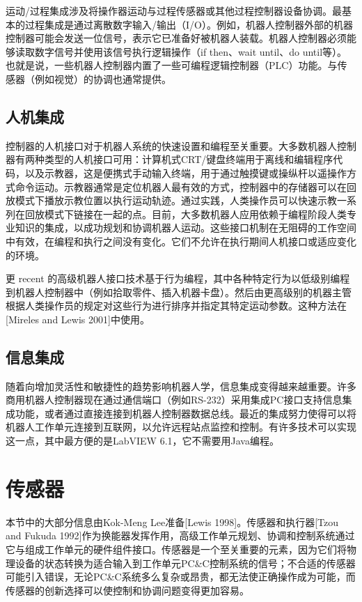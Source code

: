 \documentclass[UTF8,a4paper]{ctexart}
\begin{document}
运动/过程集成涉及将操作器运动与过程传感器或其他过程控制器设备协调。最基本的过程集成是通过离散数字输入/输出（I/O）。例如，机器人控制器外部的机器控制器可能会发送一位信号，表示它已准备好被机器人装载。机器人控制器必须能够读取数字信号并使用该信号执行逻辑操作（if then、wait until、do until等）。也就是说，一些机器人控制器内置了一些可编程逻辑控制器（PLC）功能。与传感器（例如视觉）的协调也通常提供。

\subsection{人机集成}

控制器的人机接口对于机器人系统的快速设置和编程至关重要。大多数机器人控制器有两种类型的人机接口可用：计算机式CRT/键盘终端用于离线和编辑程序代码，以及示教器，这是便携式手动输入终端，用于通过触摸键或操纵杆以遥操作方式命令运动。示教器通常是定位机器人最有效的方式，控制器中的存储器可以在回放模式下播放示教位置以执行运动轨迹。通过实践，人类操作员可以快速示教一系列在回放模式下链接在一起的点。目前，大多数机器人应用依赖于编程阶段人类专业知识的集成，以成功规划和协调机器人运动。这些接口机制在无阻碍的工作空间中有效，在编程和执行之间没有变化。它们不允许在执行期间人机接口或适应变化的环境。

更 recent 的高级机器人接口技术基于行为编程，其中各种特定行为以低级别编程到机器人控制器中（例如拾取零件、插入机器卡盘）。然后由更高级别的机器主管根据人类操作员的规定对这些行为进行排序并指定其特定运动参数。这种方法在[Mireles and Lewis 2001]中使用。

\subsection{信息集成}

随着向增加灵活性和敏捷性的趋势影响机器人学，信息集成变得越来越重要。许多商用机器人控制器现在通过通信端口（例如RS-232）采用集成PC接口支持信息集成功能，或者通过直接连接到机器人控制器数据总线。最近的集成努力使得可以将机器人工作单元连接到互联网，以允许远程站点监控和控制。有许多技术可以实现这一点，其中最方便的是LabVIEW 6.1，它不需要用Java编程。

\section{传感器}

本节中的大部分信息由Kok-Meng Lee准备[Lewis 1998]。传感器和执行器[Tzou and Fukuda 1992]作为换能器发挥作用，高级工作单元规划、协调和控制系统通过它与组成工作单元的硬件组件接口。传感器是一个至关重要的元素，因为它们将物理设备的状态转换为适合输入到工作单元PC\&C控制系统的信号；不合适的传感器可能引入错误，无论PC\&C系统多么复杂或昂贵，都无法使正确操作成为可能，而传感器的创新选择可以使控制和协调问题变得更加容易。
\end{document}
